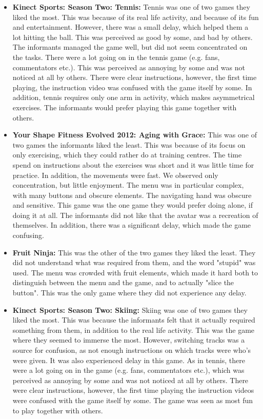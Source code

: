 \begin{itemize}
\item \textbf{Kinect Sports: Season Two: Tennis:} Tennis was one of two games they liked the most. This was because of its real life activity, and because of its fun and entertainment. However, there was a small delay, which helped them a lot hitting the ball. This was perceived as good by some, and bad by others. The informants managed the game well, but did not seem concentrated on the tasks. There were a lot going on in the tennis game (e.g. fans, commentators etc.). This was perceived as annoying by some and was not noticed at all by others. There were clear instructions, however, the first time playing, the instruction video was confused with the game itself by some. In addition, tennis requires only one arm in activity, which makes asymmetrical exercises. The informants would prefer playing this game together with others. 

\item \textbf{Your Shape Fitness Evolved 2012: Aging with Grace:} This was one of two games the informants liked the least. This was because of its focus on only exercising, which they could rather do at training centres.  The time spend on instructions about the exercises was short and it was little time for practice. In addition, the movements were fast.  We observed only concentration, but little enjoyment. The menu was in particular complex, with many buttons and obscure elements. The navigating hand was obscure and sensitive. This game was the one game they would prefer doing alone, if doing it at all. The informants did not like that the avatar was a recreation of themselves. In addition, there was a significant delay, which made the game confusing.

\item \textbf{Fruit Ninja:} This was the other of the two games they liked the least.  They did not understand what was required from them, and the word "stupid" was used. The menu was crowded with fruit elements, which made it hard both to distinguish between the menu and the game, and to actually "slice the button". This was the only game where they did not experience any delay.

\item \textbf{Kinect Sports: Season Two: Skiing:} Skiing was one of two games they liked the most. This was because the informants felt that it actually required something from them, in addition to the real life activity. This was the game where they seemed to immerse the most. However, switching tracks was a source for confusion, as not enough instructions on which tracks were who's were given. It was also experienced delay in this game. As in tennis, there were a lot going on in the game (e.g. fans, commentators etc.), which was perceived as annoying by some and was not noticed at all by others. There were clear instructions, however, the first time playing the instruction videos were confused with the game itself by some. The game was seen as most fun to play together with others. 
\end{itemize}

